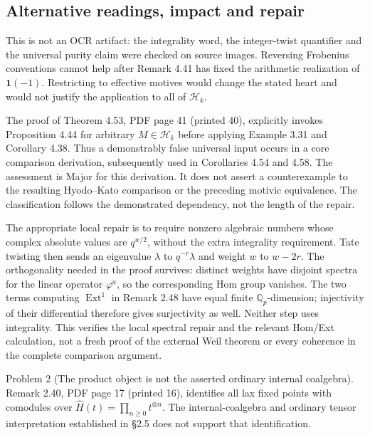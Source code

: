 \documentclass[10pt]{article}
\begin{document}
\subsection*{Alternative readings, impact and repair}
This is not an OCR artifact: the integrality word, the integer-twist quantifier and the universal purity claim were checked on source images. Reversing Frobenius conventions cannot help after Remark 4.41 has fixed the arithmetic realization of \(\mathbf 1(-1)\). Restricting to effective motives would change the stated heart and would not justify the application to all of \(\mathcal H_k\).\par
The proof of Theorem 4.53, PDF page 41 (printed 40), explicitly invokes Proposition 4.44 for arbitrary \(M\in\mathcal H_k\) before applying Example 3.31 and Corollary 4.38. Thus a demonstrably false universal input occurs in a core comparison derivation, subsequently used in Corollaries 4.54 and 4.58. The assessment is Major for this derivation. It does not assert a counterexample to the resulting Hyodo–Kato comparison or the preceding motivic equivalence. The classification follows the demonstrated dependency, not the length of the repair.\par
The appropriate local repair is to require nonzero algebraic numbers whose complex absolute values are \(q^{w/2}\), without the extra integrality requirement. Tate twisting then sends an eigenvalue \(\lambda\) to \(q^{-r}\lambda\) and weight \(w\) to \(w-2r\). The orthogonality needed in the proof survives: distinct weights have disjoint spectra for the linear operator \(\varphi^a\), so the corresponding Hom group vanishes. The two terms computing \(\mathop{\mathrm{Ext}}^1\) in Remark 2.48 have equal finite \(\mathbb Q_p\)-dimension; injectivity of their differential therefore gives surjectivity as well. Neither step uses integrality. This verifies the local spectral repair and the relevant Hom/Ext calculation, not a fresh proof of the external Weil theorem or every coherence in the complete comparison argument.\par
Problem 2 (The product object is not the asserted ordinary internal coalgebra).  Remark 2.40, PDF page 17 (printed 16), identifies all lax fixed points with comodules over \(\widehat H(t)=\prod_{n\ge0}t^{\otimes n}\). The internal-coalgebra and ordinary tensor interpretation established in §2.5 does not support that identification.\par
\end{document}
